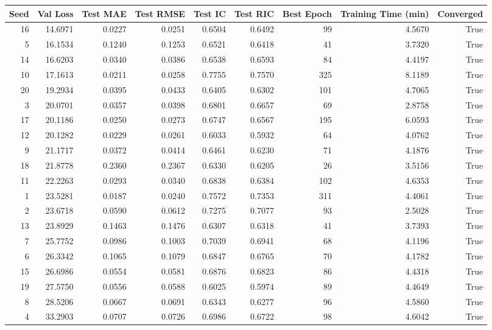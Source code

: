 \begin{tabular}{rrrrrrrrr}
\toprule
Seed & Val Loss & Test MAE & Test RMSE & Test IC & Test RIC & Best Epoch & Training Time (min) & Converged \\
\midrule
16 & 14.6971 & 0.0227 & 0.0251 & 0.6504 & 0.6492 & 99 & 4.5670 & True \\
5 & 16.1534 & 0.1240 & 0.1253 & 0.6521 & 0.6418 & 41 & 3.7320 & True \\
14 & 16.6203 & 0.0340 & 0.0386 & 0.6538 & 0.6593 & 84 & 4.4197 & True \\
10 & 17.1613 & 0.0211 & 0.0258 & 0.7755 & 0.7570 & 325 & 8.1189 & True \\
20 & 19.2934 & 0.0395 & 0.0433 & 0.6405 & 0.6302 & 101 & 4.7065 & True \\
3 & 20.0701 & 0.0357 & 0.0398 & 0.6801 & 0.6657 & 69 & 2.8758 & True \\
17 & 20.1186 & 0.0250 & 0.0273 & 0.6747 & 0.6567 & 195 & 6.0593 & True \\
12 & 20.1282 & 0.0229 & 0.0261 & 0.6033 & 0.5932 & 64 & 4.0762 & True \\
9 & 21.1717 & 0.0372 & 0.0414 & 0.6461 & 0.6230 & 71 & 4.1876 & True \\
18 & 21.8778 & 0.2360 & 0.2367 & 0.6330 & 0.6205 & 26 & 3.5156 & True \\
11 & 22.2263 & 0.0293 & 0.0340 & 0.6838 & 0.6384 & 102 & 4.6353 & True \\
1 & 23.5281 & 0.0187 & 0.0240 & 0.7572 & 0.7353 & 311 & 4.4061 & True \\
2 & 23.6718 & 0.0590 & 0.0612 & 0.7275 & 0.7077 & 93 & 2.5028 & True \\
13 & 23.8929 & 0.1463 & 0.1476 & 0.6307 & 0.6318 & 41 & 3.7393 & True \\
7 & 25.7752 & 0.0986 & 0.1003 & 0.7039 & 0.6941 & 68 & 4.1196 & True \\
6 & 26.3342 & 0.1065 & 0.1079 & 0.6847 & 0.6765 & 70 & 4.1782 & True \\
15 & 26.6986 & 0.0554 & 0.0581 & 0.6876 & 0.6823 & 86 & 4.4318 & True \\
19 & 27.5750 & 0.0556 & 0.0588 & 0.6025 & 0.5974 & 89 & 4.4649 & True \\
8 & 28.5206 & 0.0667 & 0.0691 & 0.6343 & 0.6277 & 96 & 4.5860 & True \\
4 & 33.2903 & 0.0707 & 0.0726 & 0.6986 & 0.6722 & 98 & 4.6042 & True \\
\bottomrule
\end{tabular}
